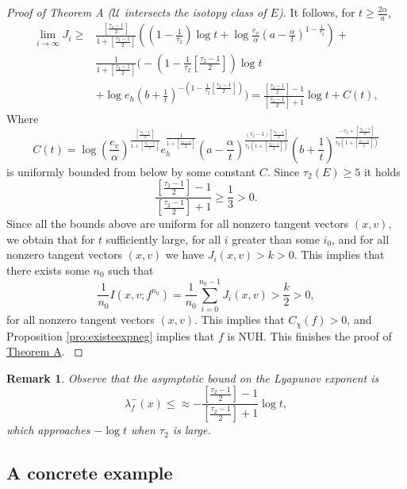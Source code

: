 \documentclass[11pt,letterpaper,reqno]{article}
\newtheorem{remark}{Remark}[section]
\begin{document}
\begin{proof}[Proof of Theorem A ($\mathcal U$ intersects the isotopy class of $E$)]
 It follows, for $t\geq \frac{2\alpha}{a}$,
 \begin{align*}
\lim_{i\rightarrow\infty}J_i\geq&\frac{\left[\frac{\tau_2-1}2\right]}{1+\left[\frac{\tau_2-1}2\right]}\left(\left(1-\frac{1}{\tau_2}\right)\log t+\log \frac{e_v}{\alpha} \left(a-\frac{\alpha}t\right)^{1-\frac 1{\tau_2}}\right)+\\
&\frac 1{1+\left[\frac{\tau_2-1}2\right]}\Bigg( -\left(1-\frac1{\tau_2}\left[\frac{\tau_2-1}2\right]\right)\log t\\
&+\log e_h\left(b+\frac 1t\right)^{-\left(1-\frac 1{\tau_2}\left[\frac{\tau_2-1}2\right]\right)}\Bigg)=\frac{\left[\frac{\tau_2-1}2\right]-1}{\left[\frac{\tau_2-1}2\right]+1}\log t+C(t),
\end{align*}
Where
$$
C(t)=\log \left(\frac{e_v}{\alpha}\right)^{\frac{\left[\frac{\tau_2-1}2\right]}{1+\left[\frac{\tau_2-1}2\right]}}e_h^{\frac 1{1+\left[\frac{\tau_2-1}2\right]}}\left(a-\frac{\alpha}t \right)^ {\frac{(\tau_2-1)\left[\frac{\tau_2-1}2\right]}{\tau_2\left(1+\left[\frac{\tau_2-1}2\right]\right)}}\left(b+\frac 1t\right)^{\frac{-\tau_2+\left[\frac{\tau_2-1}2\right]}{\tau_2\left(1+\left[\frac{\tau_2-1}2\right]\right)}}
$$
is uniformly bounded from below by some constant $C$. Since $\tau_2(E)\geq 5$ it holds
$$
\frac{\left[\frac{\tau_2-1}2\right]-1}{\left[\frac{\tau_2-1}2\right]+1}\geq\frac 13>0.
$$
Since all the bounds above are uniform for all nonzero tangent vectors $(x,v)$, we obtain that for $t$ sufficiently large, for all $i$ greater than some $i_0$, and for all nonzero tangent vectors $(x,v)$ we have $J_i(x,v)>k>0$. This implies that there exists some $n_0$ such that
$$
\frac 1{n_0}I(x,v;f^{n_0})=\frac 1{n_0}\sum_{i=0}^{n_0-1}J_i(x,v)>\frac k2>0,
$$
for all nonzero tangent vectors $(x,v)$. This implies that $C_{\chi}(f)>0$, and Proposition \ref{pro:existeexpneg} implies that $f$ is NUH. This finishes the proof of \hyperlink{theorem A}{Theorem A}. \label{pag:finalprueba}

\end{proof}

\begin{remark}
Observe that the asymptotic bound on the Lyapunov exponent is
$$
\lambda_f^-(x)\leq\approx-\frac{\left[\frac{\tau_2-1}2\right]-1}{\left[\frac{\tau_2-1}2\right]+1}\log t,
$$
which approaches $-\log t$ when $\tau_2$ is large.
\end{remark}


\subsection{A concrete example} %
\label{sub:concrete_examples}
\end{document}
